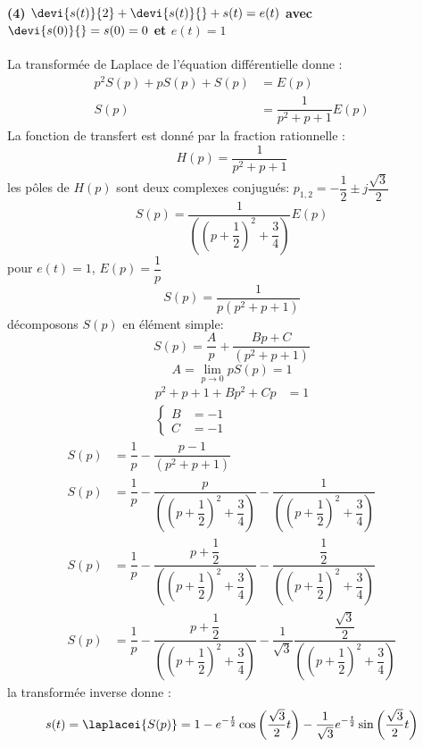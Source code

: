 \newpage
\paragraph{\textbf{(4) $\devi{s(t)}{2} + \devi{s(t)}{} + s(t) = e(t)$ 
avec $\devi{s(0)}{}=s(0)=0$ et $e(t) = 1$}}
La transformée de Laplace de l'équation différentielle donne :
\begin{align*}
    p^2S(p)+pS(p)+S(p)&=E(p) \\
    S(p)&=\dfrac{1}{p^2+p+1}E(p)
\end{align*}
La fonction de transfert est donné par la fraction rationnelle :
$$
H(p)=\dfrac{1}{p^2+p+1}
$$
les pôles de $H(p)$ sont deux complexes conjugués: 
$p_{1,2}=-\dfrac{1}{2}\pm j\dfrac{\sqrt{3}}{2}$
$$
S(p) = \dfrac{1}{\left(\left(p+\dfrac{1}{2}\right)^2+
       \dfrac{3}{4}\right)}E(p)
$$
pour $e(t)=1$, $E(p)=\dfrac{1}{p}$
$$
S(p) =\dfrac{1}{p\left(p^2+p+1\right)}
$$
décomposons $S(p)$ en élément simple:
$$
S(p)=\dfrac{A}{p}+\dfrac{Bp+C}{\left(p^2+p+1\right)}
$$
$$
A=\lim\limits_{p \rightarrow 0} pS(p) = 1
$$
\begin{align*}
    p^2+p+1 + Bp^2+Cp &= 1 \\
    \begin{cases}
        B&=-1\\
        C&=-1
    \end{cases}
\end{align*}
\begin{align*}
    S(p)&=\dfrac{1}{p}-\dfrac{p-1}{\left(p^2+p+1\right)} \\
    S(p)&=\dfrac{1}{p}-\dfrac{p}{\left(\left(p+\dfrac{1}{2}\right)^2+
          \dfrac{3}{4}\right)}-
          \dfrac{1}{\left(\left(p+\dfrac{1}{2}\right)^2+\dfrac{3}{4}\right)}\\
    S(p)&=\dfrac{1}{p}-\dfrac{p+\dfrac{1}{2}}
                             {\left(\left(p+\dfrac{1}{2}\right)^2+
                                            \dfrac{3}{4}\right)}-
                       \dfrac{\dfrac{1}{2}}{\left(\left(p+\dfrac{1}{2}\right)^2+
                             \dfrac{3}{4}\right)}\\
    S(p)&=\dfrac{1}{p}-\dfrac{p+\dfrac{1}{2}}
                             {\left(\left(p+\dfrac{1}{2}\right)^2+
                                            \dfrac{3}{4}\right)}-
                       \dfrac{1}{\sqrt{3}}\dfrac{\dfrac{\sqrt{3}}{2}}
                                                {\left(\left(p+\dfrac{1}{2}\right)^2+
                                                \dfrac{3}{4}\right)}
\end{align*}
la transformée inverse donne :
$$
s(t) = \laplacei{S(p)}=
1-e^{-\frac{t}{2}}\cos{\left(\dfrac{\sqrt{3}}{2}t\right)}-
\dfrac{1}{\sqrt{3}}e^{-\frac{t}{2}}\sin{\left(\dfrac{\sqrt{3}}{2}t\right)}
$$

